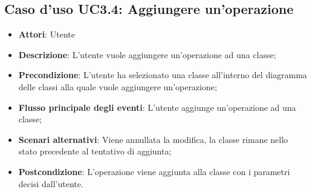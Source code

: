 \documentclass[../AnalisiDeiRequisiti.tex]{subfiles}
\begin{document}
		\subsection{Caso d'uso UC3.4: Aggiungere un'operazione}
		\begin{itemize}
			\item \textbf{Attori}: Utente
			\item \textbf{Descrizione}: L'utente vuole aggiungere un'operazione ad una classe;
			\item \textbf{Precondizione}: L'utente ha selezionato una classe all'interno del diagramma delle classi alla quale vuole aggiungere un'operazione;
			\item \textbf{Flusso principale degli eventi}: L'utente aggiunge un'operazione ad una classe;
			\item \textbf{Scenari alternativi}: Viene annullata la modifica, la classe rimane nello stato precedente al tentativo di aggiunta;
			\item \textbf{Postcondizione}: L'operazione viene aggiunta alla classe con i parametri decisi dall'utente.
		\end{itemize}
\end{document}
